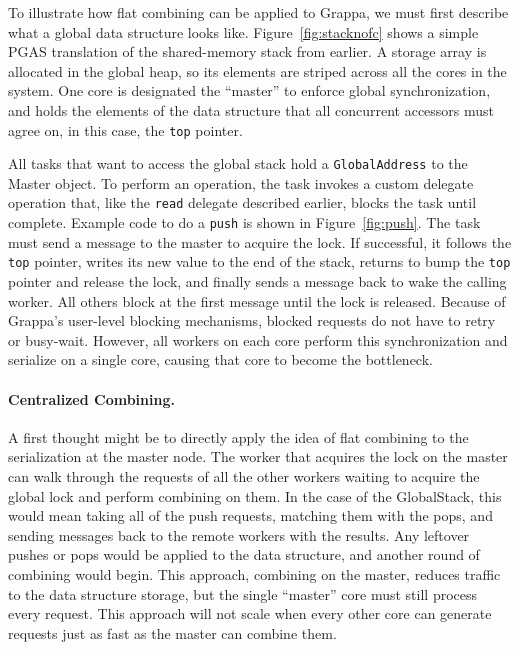To illustrate how flat combining can be applied to Grappa, we must first describe what a global data structure looks like. Figure~\ref{fig:stacknofc} shows a simple PGAS translation of the shared-memory stack from earlier. A storage array is allocated in the global heap, so its elements are striped across all the cores in the system. One core is designated the ``master'' to enforce global synchronization, and holds the elements of the data structure that all concurrent accessors must agree on, in this case, the \texttt{top} pointer.

All tasks that want to access the global stack hold a \texttt{GlobalAddress} to the Master object. To perform an operation, the task invokes a custom delegate operation that, like the \texttt{read} delegate described earlier, blocks the task until complete. Example code to do a \texttt{push} is shown in Figure~\ref{fig:push}. The task must send a message to the master to acquire the lock. If successful, it follows the \texttt{top} pointer, writes its new value to the end of the stack, returns to bump the \texttt{top} pointer and release the lock, and finally sends a message back to wake the calling worker. All others block at the first message until the lock is released. Because of Grappa's user-level blocking mechanisms, blocked requests do not have to retry or busy-wait. However, all workers on each core perform this synchronization and serialize on a single core, causing that core to become the bottleneck.

\paragraph{Centralized Combining.}
A first thought might be to directly apply the idea of flat combining to the serialization at the master node. The worker that acquires the lock on the master can walk through the requests of all the other workers waiting to acquire the global lock and perform combining on them. In the case of the GlobalStack, this would mean taking all of the push requests, matching them with the pops, and sending messages back to the remote workers with the results. Any leftover pushes or pops would be applied to the data structure, and another round of combining would begin. This approach, combining on the master, reduces traffic to the data structure storage, but the single ``master'' core must still process every request. This approach will not scale when every other core can generate requests just as fast as the master can combine them.

